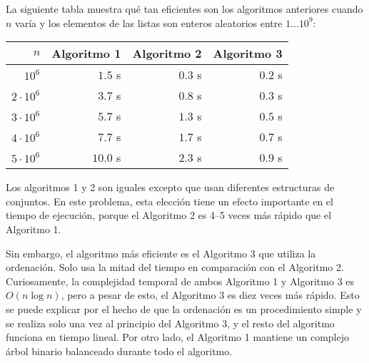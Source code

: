 La siguiente tabla muestra qué tan eficientes
son los algoritmos anteriores cuando $n$ varía y
los elementos de las listas son enteros aleatorios
entre $1 \ldots 10^9$:

\begin{center}
\begin{tabular}{rrrr}
$n$ & Algoritmo 1 & Algoritmo 2 & Algoritmo 3 \\
\hline
$10^6$ & $1.5$ s & $0.3$ s & $0.2$ s \\
$2 \cdot 10^6$ & $3.7$ s & $0.8$ s & $0.3$ s \\
$3 \cdot 10^6$ & $5.7$ s & $1.3$ s & $0.5$ s \\
$4 \cdot 10^6$ & $7.7$ s & $1.7$ s & $0.7$ s \\
$5 \cdot 10^6$ & $10.0$ s & $2.3$ s & $0.9$ s \\
\end{tabular}
\end{center}

Los algoritmos 1 y 2 son iguales excepto que
usan diferentes estructuras de conjuntos.
En este problema, esta elección tiene un efecto importante en
el tiempo de ejecución, porque el Algoritmo 2
es 4–5 veces más rápido que el Algoritmo 1.

Sin embargo, el algoritmo más eficiente es el Algoritmo 3
que utiliza la ordenación.
Solo usa la mitad del tiempo en comparación con el Algoritmo 2.
Curiosamente, la complejidad temporal de ambos
Algoritmo 1 y Algoritmo 3 es $O(n \log n)$,
pero a pesar de esto, el Algoritmo 3 es diez veces más rápido.
Esto se puede explicar por el hecho de que
la ordenación es un procedimiento simple y se realiza
solo una vez al principio del Algoritmo 3,
y el resto del algoritmo funciona en tiempo lineal.
Por otro lado,
el Algoritmo 1 mantiene un complejo árbol binario balanceado
durante todo el algoritmo.

